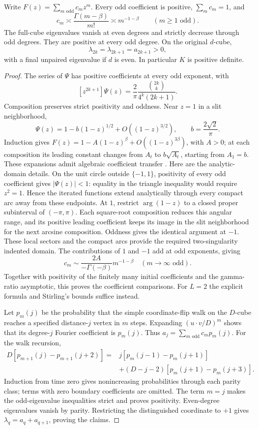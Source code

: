 \begin{lemma}\label{lem:power}
Write $F(z)=\sum_{m\text{ odd}}c_mz^m$. Every odd coefficient is
positive, $\sum_m c_m=1$, and
\[
 c_m\asymp\frac{\Gamma(m-\beta)}{m!}\asymp m^{-1-\beta}
 \qquad(m\ge1\text{ odd}).
\]
The full-cube eigenvalues vanish at even degrees and strictly decrease
through odd degrees. They are positive at every odd degree. On the
original $d$-cube,
\[
 \lambda_{2k}=\lambda_{2k+1}=a_{2k+1}>0,
\]
with a final unpaired eigenvalue if $d$ is even. In particular $K$
is positive definite.
\end{lemma}
\begin{proof}
The series of $\Psi$ has positive coefficients at every odd exponent,
with
\[
 [z^{2k+1}]\Psi(z)=\frac2\pi\frac{\binom{2k}{k}}{4^k(2k+1)}.
\]
Composition preserves strict positivity and oddness. Near $z=1$ in
a slit neighborhood,
\[
 \Psi(z)=1-b(1-z)^{1/2}+O((1-z)^{3/2}),
 \qquad b=\frac{2\sqrt2}{\pi}.
\]
Induction gives
$F(z)=1-A(1-z)^\beta+O((1-z)^{3\beta})$, with $A>0$;
at each composition its leading constant changes from $A_t$ to
$b\sqrt{A_t}$, starting from $A_1=b$.
These expansions admit algebraic coefficient transfer
\cite[Chapter VI]{flajolet2009}. Here are the analytic-domain details.
On the unit circle outside $\{-1,1\}$, positivity of every odd
coefficient gives $|\Psi(z)|<1$: equality in the triangle inequality
would require $z^2=1$. Hence the iterated functions extend
analytically through every compact arc away from these endpoints.
At $1$, restrict $\arg(1-z)$ to a closed proper subinterval of
$(-\pi,\pi)$. Each square-root composition reduces this angular
range, and its positive leading coefficient keeps its image in the
slit neighborhood for the next arcsine composition. Oddness gives
the identical argument at $-1$. These local sectors and the compact
arcs provide the required two-singularity indented domain.
The contributions of $1$ and $-1$ add at odd exponents, giving
\[
 c_m\sim\frac{2A}{-\Gamma(-\beta)}m^{-1-\beta}
 \quad(m\to\infty\text{ odd}).
\]
Together with positivity of the finitely many initial coefficients
and the gamma-ratio asymptotic, this proves the coefficient comparisons.
For $L=2$ the explicit formula and Stirling's bounds suffice instead.

Let $p_m(j)$ be the probability that the simple coordinate-flip walk
on the $D$-cube reaches a specified distance-$j$ vertex in $m$ steps.
Expanding $(u\cdot v/D)^m$ shows that its degree-$j$ Fourier coefficient
is $p_m(j)$. Thus $a_j=\sum_{m\text{ odd}}c_mp_m(j)$.
For the walk recursion,
\begin{align*}
 D[p_{m+1}(j)-p_{m+1}(j+2)]
 ={}&j[p_m(j-1)-p_m(j+1)]\\
 &+(D-j-2)[p_m(j+1)-p_m(j+3)].
\end{align*}
Induction from time zero gives nonincreasing probabilities through
each parity class; terms with zero boundary coefficients are omitted.
The term $m=j$ makes the odd-eigenvalue inequalities strict and proves
positivity. Even-degree eigenvalues vanish by parity.
Restricting the distinguished coordinate to $+1$ gives
$\lambda_q=a_q+a_{q+1}$, proving the claims.
\end{proof}

